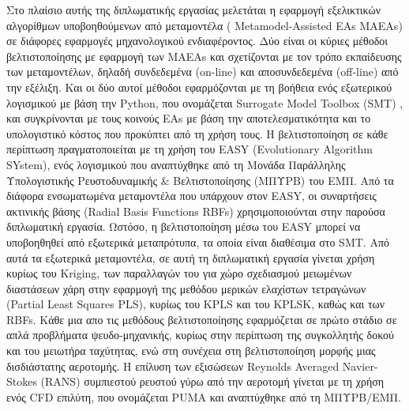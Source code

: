 \documentclass[twoside, 12pt,notitlepage]{report}
\begin{document}
Στο πλαίσιο αυτής της διπλωματικής εργασίας μελετάται η 
εφαρμογή εξελικτικών αλγορίθμων υποβοηθούμενων από μεταμοντέλα 
( Metamodel-Assisted EAs MAEAs) σε διάφορες εφαρμογές 
μηχανολογικού ενδιαφέροντος. Δύο είναι οι κύριες μέθοδοι 
βελτιστοποίησης με εφαρμογή των MAEAs και σχετίζονται με τον τρόπο 
εκπαίδευσης των μεταμοντέλων, δηλαδή συνδεδεμένα (on-line) και 
αποσυνδεδεμένα (off-line) από την εξέλιξη. Και οι δύο αυτοί μέθοδοι 
εφαρμόζονται με τη βοήθεια ενός εξωτερικού λογισμικού με βάση την 
Python, που ονομάζεται Surrogate Model Toolbox (SMT)
\cite{preprint_SMT_app}, και συγκρίνονται με τους κοινούς ΕΑs με 
βάση την αποτελεσματικότητα και το υπολογιστικό κόστος που 
προκύπτει από τη χρήση τους. Η βελτιστοποίηση σε κάθε περίπτωση 
πραγματοποιείται με τη χρήση του EASY\cite{EASY_app} (Evolutionary 
Algorithm SYstem), ενός λογισμικού που αναπτύχθηκε από τη Μονάδα 
Παράλληλης Υπολογιστικής Ρευστοδυναμικής \& Βελτιστοποίησης (ΜΠΥΡΒ) 
του ΕΜΠ. Από τα διάφορα ενσωματωμένα μεταμοντέλα που υπάρχουν στον 
EASY, οι συναρτήσεις ακτινικής βάσης\cite{RBF_app} (Radial Basis 
Functions RBFs) χρησιμοποιούνται στην παρούσα διπλωματική εργασία. 
Ωστόσο, η βελτιστοποίηση μέσω του EASY μπορεί να υποβοηθηθεί από 
εξωτερικά μεταπρότυπα, τα οποία είναι διαθέσιμα στο SMT. Από αυτά 
τα εξωτερικά μεταμοντέλα, σε αυτή τη διπλωματική εργασία γίνεται 
χρήση κυρίως του Kriging\cite{Kriging_app}, των παραλλαγών του για 
χώρο σχεδιασμού μειωμένων διαστάσεων χάρη στην εφαρμογή της
μεθόδου μερικών ελαχίστων τετραγώνων (Partial Least Squares PLS), 
κυρίως του KPLS\cite{KPLS_app} και του KPLSK\cite{KPLSK_app}, 
καθώς και των RBFs. Κάθε μια απο τις μεθόδους βελτιστοποίησης 
εφαρμόζεται σε πρώτο στάδιο σε απλά προβλήματα ψευδο-μηχανικής, 
κυρίως στην περίπτωση της συγκολλητής δοκού και του μειωτήρα 
ταχύτητας, ενώ στη συνέχεια στη βελτιστοποίηση μορφής μιας 
δισδιάστατης αεροτομής. Η επίλυση των εξισώσεων Reynolds 
Averaged Navier-Stokes (RANS) συμπιεστού ρευστού γύρω από την 
αεροτομή γίνεται με τη χρήση ενός CFD επιλύτη, που ονομάζεται 
PUMA\cite{PUMA_app} και αναπτύχθηκε από τη ΜΠΥΡΒ/ΕΜΠ.


\newpage
\end{document}
